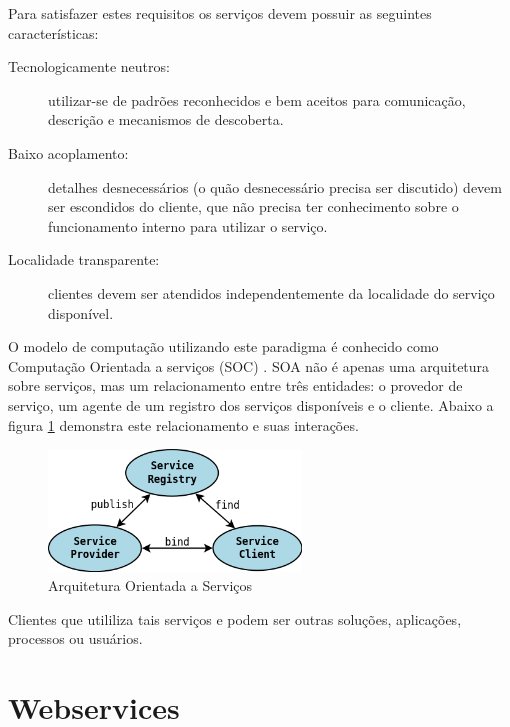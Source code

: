 Para satisfazer estes requisitos os servi\c{c}os devem possuir as seguintes caracter\'isticas:
\begin{description}
    \item[Tecnologicamente neutros:] utilizar-se de padr\~oes reconhecidos e bem aceitos para comunica\c{c}\~ao, descri\c{c}\~ao e mecanismos de descoberta.
    \item[Baixo acoplamento:] detalhes desnecess\'arios (o qu\~ao desnecess\'ario precisa ser discutido) devem ser escondidos do cliente, que n\~ao precisa ter conhecimento sobre o funcionamento interno para utilizar o servi\c{c}o.
    \item[Localidade transparente:] clientes devem ser atendidos independentemente da localidade do servi\c{c}o dispon\'ivel.
\end{description}

O modelo de computa\c{c}\~ao utilizando este paradigma \'e conhecido como Computa\c{c}\~ao Orientada a servi\c{c}os (SOC) \cite{581580}. SOA n\~ao \'e apenas uma arquitetura sobre servi\c{c}os, mas um relacionamento entre tr\^es entidades: o provedor de servi\c{c}o, um agente de um registro dos servi\c{c}os dispon\'iveis e o cliente. Abaixo a figura \ref{soaOverview} demonstra este relacionamento e suas intera\c{c}\~oes.

\begin{figure}[H]
   \centering
   \includegraphics[width=0.6\textwidth]{figuras/soa.png}
   \caption{Arquitetura Orientada a Servi\c{c}os}
   \label{soaOverview}
\end{figure}

Clientes que utililiza tais servi\c{c}os e podem ser outras solu\c{c}\~oes, aplica\c{c}\~oes, processos ou usu\'arios.


\section{Webservices}

